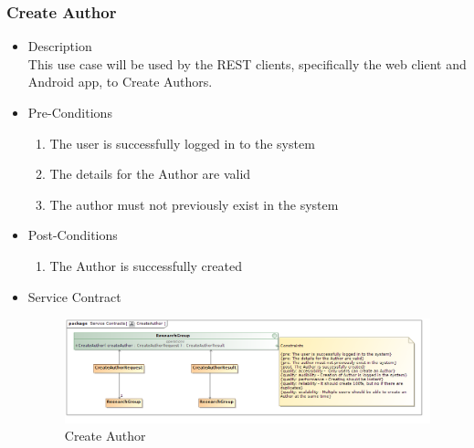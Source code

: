 \documentclass[a4paper,10pt]{article}
\begin{document}
\subsubsection{Create Author}
	\begin{itemize}
		\item Description\\
			This use case will be used by the REST clients, specifically the web client and Android app, to Create Authors.
		\item Pre-Conditions
			\begin{enumerate}
				\item The user is successfully logged in to the system
				\item The details for the Author are valid
				\item The author must not previously exist in the system 
			\end{enumerate}
		\item Post-Conditions
			\begin{enumerate}
				\item The Author is successfully created	
			\end{enumerate}
		\item Service Contract
			\begin{figure}[H]
				\includegraphics[scale=0.5]{CreateAuthor}
				\caption{Create Author}
			\end{figure}
	\end{itemize}
\end{document}

